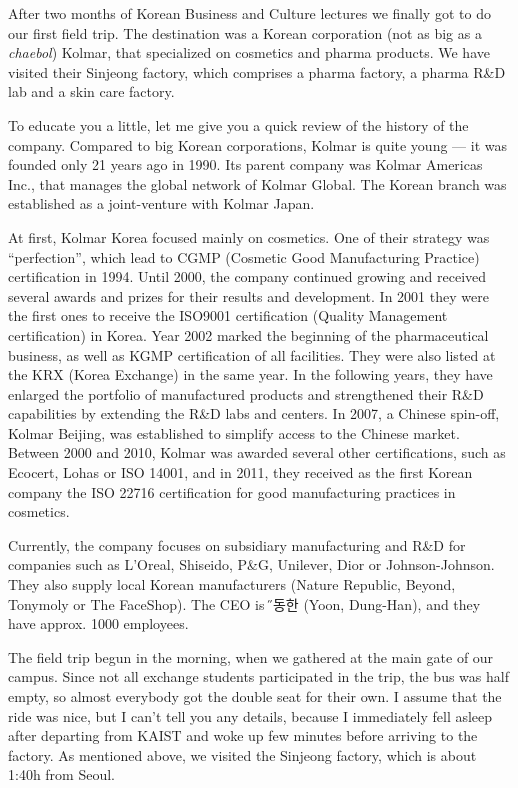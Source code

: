 \begin{post}
	\begin{content}
After two months of Korean Business and Culture lectures we finally got to do our first field trip. The destination was a Korean corporation (not as big as a \textit{chaebol}) Kolmar, that specialized on cosmetics and pharma products. We have visited their Sinjeong factory, which comprises a pharma factory, a pharma R\&D lab and a skin care factory.

To educate you a little, let me give you a quick review of the history of the company. Compared to big Korean corporations, Kolmar is quite young --- it was founded only 21 years ago in 1990. Its parent company was Kolmar Americas Inc., that manages the global network of Kolmar Global. The Korean branch was established as a joint-venture with Kolmar Japan.

At first, Kolmar Korea focused mainly on cosmetics. One of their strategy was ``perfection'', which lead to CGMP (Cosmetic Good Manufacturing Practice) certification in 1994. Until 2000, the company continued growing and received several awards and prizes for their results and development. In 2001 they were the first ones to receive the ISO9001 certification (Quality Management certification) in Korea. Year 2002 marked the beginning of the pharmaceutical business, as well as KGMP certification of all facilities. They were also listed at the KRX (Korea Exchange) in the same year. In the following years, they have enlarged the portfolio of manufactured products and strengthened their R\&D capabilities by extending the R\&D labs and centers. In 2007, a Chinese spin-off, Kolmar Beijing, was established to simplify access to the Chinese market. Between 2000 and 2010, Kolmar was awarded several other certifications, such as Ecocert, Lohas or ISO 14001, and in 2011, they received as the first Korean company the ISO 22716 certification for good manufacturing practices in cosmetics.

Currently, the company focuses on subsidiary manufacturing and R\&D for companies such as L'Oreal, Shiseido, P\&G, Unilever, Dior or Johnson-Johnson. They also supply local Korean manufacturers (Nature Republic, Beyond, Tonymoly or The FaceShop). The CEO is {\H 윤동한} (Yoon, Dung-Han), and they have approx. 1000 employees.

The field trip begun in the morning, when we gathered at the main gate of our campus. Since not all exchange students participated in the trip, the bus was half empty, so almost everybody got the double seat for their own. I assume that the ride was nice, but I can't tell you any details, because I immediately fell asleep after departing from KAIST and woke up few minutes before arriving to the factory. As mentioned above, we visited the Sinjeong factory, which is about 1:40h from Seoul.


\end{content}
\end{post}
